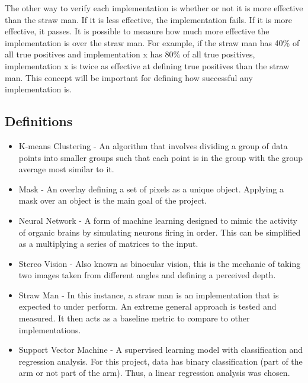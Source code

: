 \documentclass[10pt,journal,compsoc, draftclsnofoot,onecolumn]{IEEEtran}
\begin{document}
\noindent
The other way to verify each implementation is whether or not it is more effective than the straw man.
If it is less effective, the implementation fails.
If it is more effective, it passes.
It is possible to measure how much more effective the implementation is over the straw man.
For example, if the straw man has 40\% of all true positives and implementation x has 80\% of all true positives, implementation x is twice as effective at defining true positives than the straw man.
This concept will be important for defining how successful any implementation is.

\subsection{Definitions}
\begin{itemize}
\item K-means Clustering - An algorithm that involves dividing a group of data points into smaller groups such that each point is in the group with the group average most similar to it.

\item Mask - An overlay defining a set of pixels as a unique object.
Applying a mask over an object is the main goal of the project.

\item Neural Network - A form of machine learning designed to mimic the activity of organic brains by simulating neurons firing in order. This can be simplified as a multiplying a series of matrices to the input.

\item Stereo Vision - Also known as binocular vision, this is the mechanic of taking two images taken from different angles and defining a perceived depth.

\item Straw Man - In this instance, a straw man is an implementation that is expected to under perform.
An extreme general approach is tested and measured.
It then acts as a baseline metric to compare to other implementations.

\item Support Vector Machine - A supervised learning model with classification and regression analysis.
For this project, data has binary classification (part of the arm or not part of the arm).
Thus, a linear regression analysis was chosen.

\end{itemize}
\end{document}
